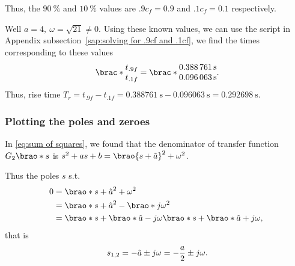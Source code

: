 \documentclass[12pt]{article}
\DeclarePairedDelimiter\brao()%
\DeclarePairedDelimiter\brac[]%
\begin{document}
\begin{enumerate}[(a)]
        Thus, the $\SI{90}\percent$ and $\SI{10}\percent$ values are $.9c_f = 0.9$ and $.1c_f = 0.1$ respectively.

        Well $a = 4,\ \omega = \sqrt{21} \not= 0$.
        Using these known values, we can use the script in Appendix subsection~\ref{sap:solving for .9cf and .1cf}, we find the times corresponding to these values
        \begin{equation}
            \brac*{
                \begin{matrix}
                    t_{.9f} \\*
                    t_{.1f} \\*
                \end{matrix}
            }
            =
            \brac*{
                \begin{matrix}
                    \SI{0.388761}\second \\*
                    \SI{0.096063}\second \\*
                \end{matrix}
            }\rlap.
        \end{equation}
        Thus, rise time $T_r = t_{.9f} - t_{.1f} = \SI{0.388761}\second - \SI{0.096063}\second = \SI{0.292698}\second$.

        \subsubsection{Plotting the poles and zeroes}

        In \eqref{eq:sum of squares}, we found that the denominator of transfer function $G_2\brao*s$ is $s^2 + as + b = \brao{s + \hat{a}}^2 + \omega^2$.

        Thus the poles $s$ s.t.
        \begin{equation}
            \begin{aligned}
                0 &{}= \brao*{s + \hat{a}}^2 + \omega^2
            \\*
                  &{}= \brao*{s + \hat{a}}^2 - \brao*{j\omega}^2
            \\*
                  &{}= \brao*{s + \brao*{\hat{a} - j\omega}}\brao*{s + \brao*{\hat{a} + j\omega}},
            \\*
            \end{aligned}
        \end{equation}
        that is
        \begin{equation}\label{eq:poles}
            \begin{aligned}
                s_{1,2} = -\hat{a} \pm j\omega
                = -\frac{a}2 \pm j\omega
                \rlap.
            \end{aligned}
        \end{equation}


\end{enumerate}
\end{document}
